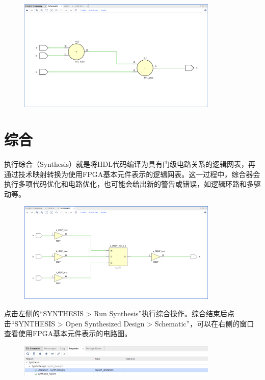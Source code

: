 \documentclass{ctexart}
\begin{document}
\begin{figure}[H]
    \centering
    \includegraphics[width=0.85\textwidth]{lab0/25.png}
\end{figure}


\section{综合}

执行综合（Synthesis）就是将HDL代码编译为具有门级电路关系的逻辑网表，再通过技术映射转换为使用FPGA基本元件表示的逻辑网表。这一过程中，综合器会执行多项代码优化和电路优化，也可能会给出新的警告或错误，如逻辑环路和多驱动等。

\begin{figure}[H]
    \centering
    \includegraphics[width=0.85\textwidth]{lab0/26.png}
\end{figure}

点击左侧的“SYNTHESIS > Run Synthesis”执行综合操作。综合结束后点击“SYNTHESIS > Open Synthesized Design > Schematic”，可以在右侧的窗口查看使用FPGA基本元件表示的电路图。

\begin{figure}[H]
    \centering
    \includegraphics[width=0.85\textwidth]{lab0/27.png}
\end{figure}
\end{document}
